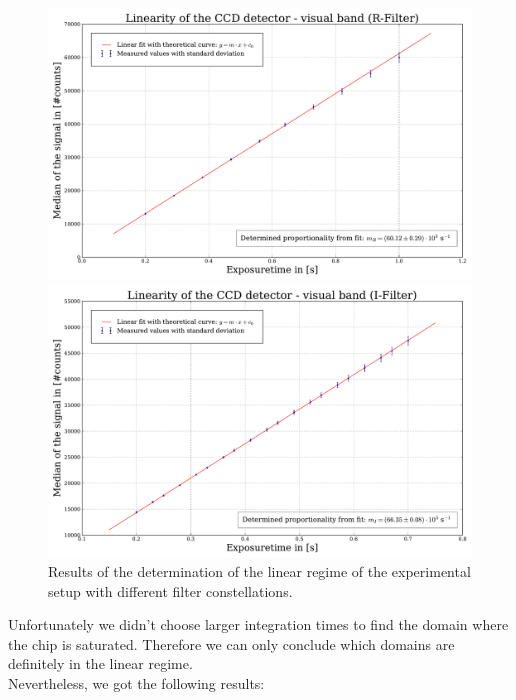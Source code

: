 \begin{figure}[H]
	\begin{minipage}{0.4\textwidth}
		\includegraphics[scale = 0.2]{figures/Plots/linearityR}
	\end{minipage}
	\begin{minipage}{0.4\textwidth}
	\hspace{1.7cm}
		\includegraphics[scale=0.2]{figures/Plots/linearityI}
	\end{minipage}
	\caption[Determination of the linear regime]{Results of the determination of the linear regime of the experimental setup with different filter constellations.}
\end{figure} 
Unfortunately we didn't choose larger integration times to find the domain where the chip is saturated. Therefore we can only conclude which domains are definitely in the linear regime.\\
Nevertheless, we got the following results:
